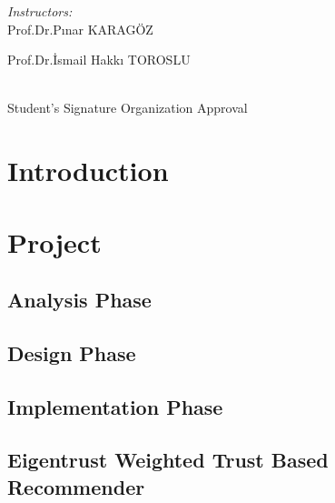 \documentclass[12pt]{article}
\begin{document}
\begin{titlepage}
\begin{minipage}{0.4\textwidth}
			
		\end{minipage}
		\begin{minipage}{0.4\textwidth}
			\begin{flushright} \large
				\emph{Instructors:} \\
				Prof.Dr.Pınar KARAGÖZ \\
			\end{flushright}
			\begin{flushright} \large
				Prof.Dr.İsmail Hakkı TOROSLU \\
			\end{flushright}
		\end{minipage}\\[1cm]
		\vspace{2cm}
		Student's Signature \hspace{150px} Organization Approval \\
	\end{titlepage}
	
	
	\tableofcontents          
	\newpage
	
	\section{Introduction}
	

	\section{Project}
	

	\subsection{Analysis Phase}
	
	
	\subsection{Design Phase}
	
	
	\subsection{Implementation Phase}
	
	
	\subsection{Eigentrust Weighted Trust Based Recommender}
	
	
\end{document}
